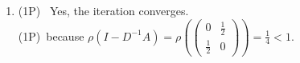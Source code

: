 {\begin{enumerate}
\begin{enumerate}
\begin{align*}
\begin{pmatrix}
		0\\
		\frac{1}{4} 
		\end{pmatrix} \\
		\textcolor{exampoints}{(1P)}~	x_3
		&= 	\begin{pmatrix}
		0&\frac{1}{2}\\
		\frac{1}{2}&0
		\end{pmatrix} 
		\begin{pmatrix}
		0\\
		\frac{1}{4}
		\end{pmatrix} 
		= 
		\begin{pmatrix}
		\frac{1}{8} \\
		0
		\end{pmatrix}
		\end{align*}
		\item 	\textcolor{exampoints}{(1P)}~ Yes, the iteration converges. \\
		\textcolor{exampoints}{(1P)}~because $\rho(I-D^{-1}A) = \rho\left(\begin{pmatrix}
		0&\frac{1}{2}\\
		\frac{1}{2}&0
		\end{pmatrix}\right) = \frac{1}{4}<1$.
	\end{enumerate} 



\end{enumerate}
}